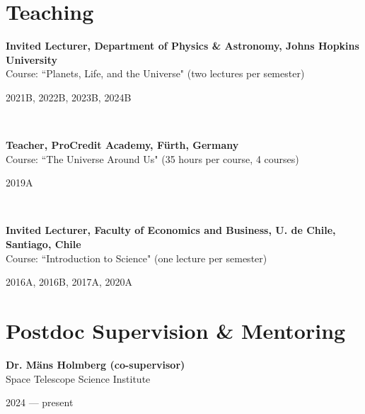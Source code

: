 \documentclass[12pt, a4paper]{article} %
\begin{document}
\section*{Teaching}

\begin{minipage}[t]{0.7\textwidth}
\begin{flushleft}%
  \setlength{\leftskip}{0.2cm}%
\textbf{Invited Lecturer, Department of Physics \& Astronomy, Johns Hopkins University}\\
Course: ``Planets, Life, and the Universe" (two lectures per semester)
\end{flushleft}
\end{minipage}
\begin{minipage}[t]{0.3\textwidth}
\hfill 2021B, 2022B, 2023B, 2024B
\end{minipage}\\

\begin{minipage}[t]{0.7\textwidth}
\begin{flushleft}%
  \setlength{\leftskip}{0.2cm}%
\textbf{Teacher, ProCredit Academy, F\"urth, Germany}\\
Course: ``The Universe Around Us" (35 hours per course, 4 courses)
\end{flushleft}
\end{minipage}
\begin{minipage}[t]{0.3\textwidth}
\hfill 2019A
\end{minipage}\\

\begin{minipage}[t]{0.7\textwidth}
\begin{flushleft}%
  \setlength{\leftskip}{0.2cm}%
\textbf{Invited Lecturer, Faculty of Economics and Business, U. de Chile, Santiago, Chile}\\
Course: ``Introduction to Science" (one lecture per semester)
\end{flushleft}
\end{minipage}
\begin{minipage}[t]{0.3\textwidth}
\hfill 2016A, 2016B, 2017A, 2020A
\end{minipage}

\section*{Postdoc Supervision \& Mentoring}

\begin{minipage}[t]{0.7\textwidth}
\begin{flushleft}%
  \setlength{\leftskip}{0.2cm}%
\textbf{Dr. M\"ans Holmberg (co-supervisor)}\\
Space Telescope Science Institute
\end{flushleft}
\end{minipage}
\begin{minipage}[t]{0.3\textwidth}
\hfill 2024 --- present
\end{minipage}\\
\end{document}
